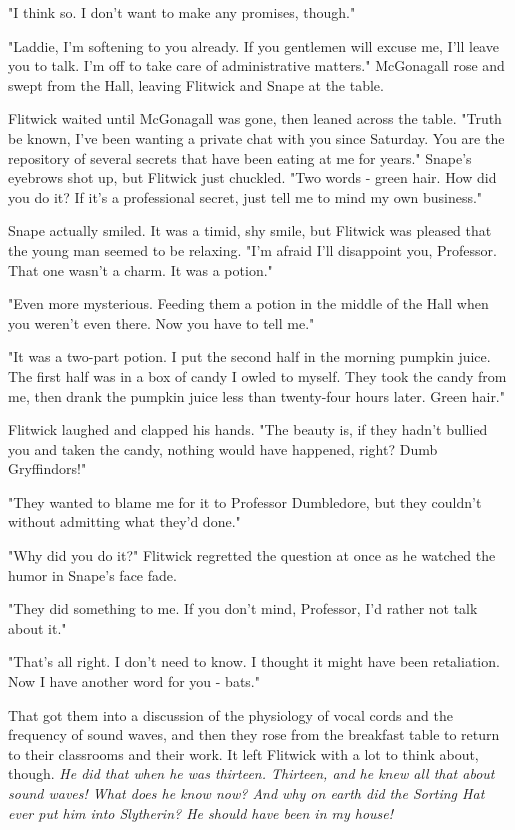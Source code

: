 "I think so. I don't want to make any promises, though."

"Laddie, I'm softening to you already. If you gentlemen will excuse me, I'll leave you to talk. I'm off to take care of administrative matters." McGonagall rose and swept from the Hall, leaving Flitwick and Snape at the table.

Flitwick waited until McGonagall was gone, then leaned across the table. "Truth be known, I've been wanting a private chat with you since Saturday. You are the repository of several secrets that have been eating at me for years." Snape's eyebrows shot up, but Flitwick just chuckled. "Two words - green hair. How did you do it? If it's a professional secret, just tell me to mind my own business."

Snape actually smiled. It was a timid, shy smile, but Flitwick was pleased that the young man seemed to be relaxing. "I'm afraid I'll disappoint you, Professor. That one wasn't a charm. It was a potion."

"Even more mysterious. Feeding them a potion in the middle of the Hall when you weren't even there. Now you have to tell me."

"It was a two-part potion. I put the second half in the morning pumpkin juice. The first half was in a box of candy I owled to myself. They took the candy from me, then drank the pumpkin juice less than twenty-four hours later. Green hair."

Flitwick laughed and clapped his hands. "The beauty is, if they hadn't bullied you and taken the candy, nothing would have happened, right? Dumb Gryffindors!"

"They wanted to blame me for it to Professor Dumbledore, but they couldn't without admitting what they'd done."

"Why did you do it?" Flitwick regretted the question at once as he watched the humor in Snape's face fade.

"They{\el} did something to me. If you don't mind, Professor, I'd rather not talk about it."

"That's all right. I don't need to know. I thought it might have been retaliation. Now I have another word for you - bats."

That got them into a discussion of the physiology of vocal cords and the frequency of sound waves, and then they rose from the breakfast table to return to their classrooms and their work. It left Flitwick with a lot to think about, though. \emph{He did that when he was thirteen. Thirteen, and he knew all that about sound waves! What does he know now? And why on earth did the Sorting Hat ever put him into Slytherin? He should have been in my house!}

